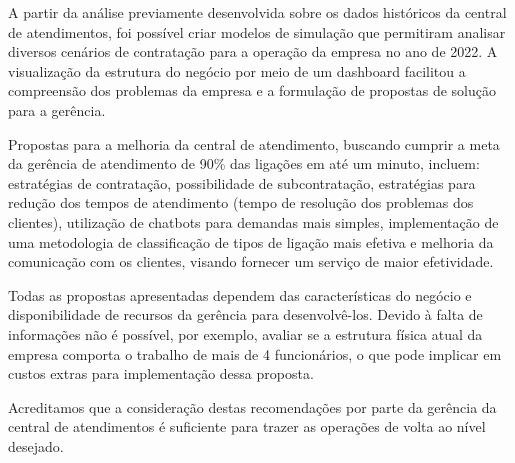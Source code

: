 A partir da análise previamente desenvolvida sobre os dados históricos da central de atendimentos, foi possível criar modelos de simulação que permitiram analisar diversos cenários de contratação para a operação da empresa no ano de 2022. A visualização da estrutura do negócio por meio de um dashboard facilitou a compreensão dos problemas da empresa e a formulação de propostas de solução para a gerência.\par
Propostas para a melhoria da central de atendimento, buscando cumprir a meta da gerência de atendimento de 90\% das ligações em até um minuto, incluem: estratégias de contratação, possibilidade de subcontratação, estratégias para redução dos tempos de atendimento (tempo de resolução dos problemas dos clientes), utilização de chatbots para demandas mais simples, implementação de uma metodologia de classificação de tipos de ligação mais efetiva e melhoria da comunicação com os clientes, visando fornecer um serviço de maior efetividade.\par
Todas as propostas apresentadas dependem das características do negócio e disponibilidade de recursos da gerência para desenvolvê-los. Devido à falta de informações não é possível, por exemplo, avaliar se a estrutura física atual da empresa comporta o trabalho de mais de 4 funcionários, o que pode implicar em custos extras para implementação dessa proposta.\par
Acreditamos que a consideração destas recomendações por parte da gerência da central de atendimentos é suficiente para trazer as operações de volta ao nível desejado.